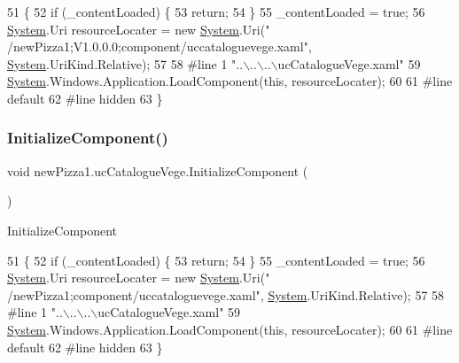 \begin{DoxyCode}
51                                           \{
52             \textcolor{keywordflow}{if} (\_contentLoaded) \{
53                 \textcolor{keywordflow}{return};
54             \}
55             \_contentLoaded = \textcolor{keyword}{true};
56             \hyperlink{namespaceSystem}{System}.Uri resourceLocater = \textcolor{keyword}{new} \hyperlink{namespaceSystem}{System}.Uri(\textcolor{stringliteral}{"
      /newPizza1;V1.0.0.0;component/uccataloguevege.xaml"}, \hyperlink{namespaceSystem}{System}.UriKind.Relative);
57             
58 \textcolor{preprocessor}{            #line 1 "..\(\backslash\)..\(\backslash\)..\(\backslash\)ucCatalogueVege.xaml"}
59             \hyperlink{namespaceSystem}{System}.Windows.Application.LoadComponent(\textcolor{keyword}{this}, resourceLocater);
60             
61 \textcolor{preprocessor}{            #line default}
62 \textcolor{preprocessor}{            #line hidden}
63         \}
\end{DoxyCode}
\mbox{\label{classnewPizza1_1_1ucCatalogueVege_afc2e8f9dfd99c8252e745a8636e230da}} 
\subsubsection{\texorpdfstring{Initialize\+Component()}{InitializeComponent()}\hspace{0.1cm}{\footnotesize\ttfamily [6/6]}}
{\footnotesize\ttfamily void new\+Pizza1.\+uc\+Catalogue\+Vege.\+Initialize\+Component (\begin{DoxyParamCaption}{ }\end{DoxyParamCaption})\hspace{0.3cm}{\ttfamily [inline]}}



Initialize\+Component 


\begin{DoxyCode}
51                                           \{
52             \textcolor{keywordflow}{if} (\_contentLoaded) \{
53                 \textcolor{keywordflow}{return};
54             \}
55             \_contentLoaded = \textcolor{keyword}{true};
56             \hyperlink{namespaceSystem}{System}.Uri resourceLocater = \textcolor{keyword}{new} \hyperlink{namespaceSystem}{System}.Uri(\textcolor{stringliteral}{"
      /newPizza1;component/uccataloguevege.xaml"}, \hyperlink{namespaceSystem}{System}.UriKind.Relative);
57             
58 \textcolor{preprocessor}{            #line 1 "..\(\backslash\)..\(\backslash\)..\(\backslash\)ucCatalogueVege.xaml"}
59             \hyperlink{namespaceSystem}{System}.Windows.Application.LoadComponent(\textcolor{keyword}{this}, resourceLocater);
60             
61 \textcolor{preprocessor}{            #line default}
62 \textcolor{preprocessor}{            #line hidden}
63         \}
\end{DoxyCode}


